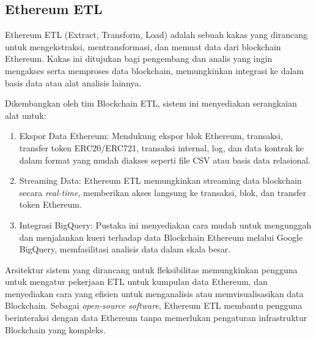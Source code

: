 \subsection{Ethereum ETL}
\label{subsec:ethereum-etl}

Ethereum ETL (Extract, Transform, Load) adalah sebuah kakas yang dirancang untuk mengekstraksi, mentransformasi, dan memuat data dari blockchain Ethereum. Kakas ini ditujukan bagi pengembang dan analis yang ingin mengakses serta memproses data blockchain, memungkinkan integrasi ke dalam basis data atau alat analisis lainnya.

Dikembangkan oleh tim Blockchain ETL, sistem ini menyediakan serangkaian alat untuk:

\begin{enumerate}
	\item Ekspor Data Ethereum: Mendukung ekspor blok Ethereum, transaksi, transfer token ERC20/ERC721, transaksi internal, log, dan data kontrak ke dalam format yang mudah diakses seperti file CSV atau basis data relasional.
	\item Streaming Data: Ethereum ETL memungkinkan streaming data blockchain secara \textit{real-time}, memberikan akses langsung ke transaksi, blok, dan transfer token Ethereum.
	\item Integrasi BigQuery: Pustaka ini menyediakan cara mudah untuk mengunggah dan menjalankan kueri terhadap data Blockchain Ethereum melalui Google BigQuery, memfasilitasi analisis data dalam skala besar.
\end{enumerate}

Arsitektur sistem yang dirancang untuk fleksibilitas memungkinkan pengguna untuk mengatur pekerjaan ETL untuk kumpulan data Ethereum, dan menyediakan cara yang efisien untuk menganalisis atau memvisualisasikan data Blockchain. Sebagai \textit{open-source software}, Ethereum ETL membantu pengguna berinteraksi dengan data Ethereum tanpa memerlukan pengaturan infrastruktur Blockchain yang kompleks. \parencite{ethereum_etl}